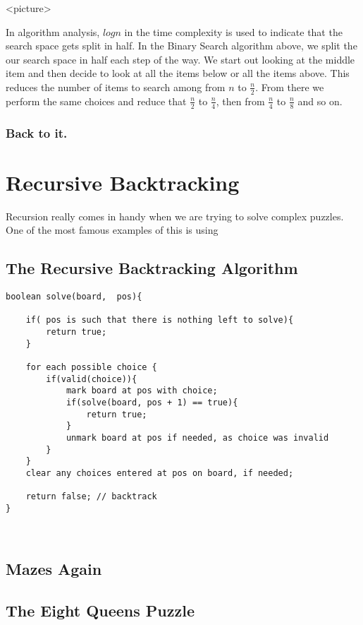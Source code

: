 <picture>


In algorithm analysis, $log n$ in the time complexity is used to indicate that the search space gets split in half.
In the Binary Search algorithm above, we split the our search space in half each step of the way.  We start out looking at the middle item and then decide to look at all the items below or all the items above.  This reduces the number of items to search among from $n$ to $\frac{n}{2}$.  From there we perform the same choices and reduce that $\frac{n}{2}$ to $\frac{n}{4}$, then from  $\frac{n}{4}$ to  $\frac{n}{8}$ and so on.

\subsubsection{Back to it.}

\section{Recursive Backtracking}
Recursion really comes in handy when we are trying to solve complex puzzles.
One of the most famous examples of this is using

\subsection*{The Recursive Backtracking Algorithm}

\begin{verbatim}
boolean solve(board,  pos){
	
	if( pos is such that there is nothing left to solve){
		return true;
	}
	
	for each possible choice {
		if(valid(choice)){
			mark board at pos with choice;
			if(solve(board, pos + 1) == true){
				return true;
			}
			unmark board at pos if needed, as choice was invalid
		}
	}
	clear any choices entered at pos on board, if needed;
	
	return false; // backtrack
}
	
	
\end{verbatim}


\subsection{Mazes Again}



\subsection{The Eight Queens Puzzle}

